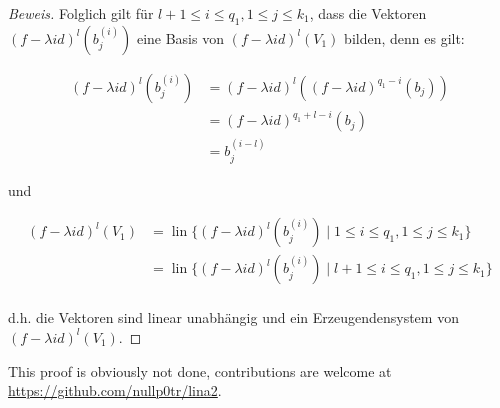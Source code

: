 \documentclass{article}
\newcommand{\basis}[2]{b_{#1}^{({#2})}}
\newcommand{\flam}[1]{(f-{\lambda}id)^{{#1}}}
\DeclareMathOperator{\lin}{lin}
\begin{document}
\begin{proof}[Beweis]
  Folglich gilt für $l+1 \le i \le q_1, 1 \le j \le k_1$, dass die Vektoren $\flam{l}(\basis{j}{i})$ eine Basis
  von $\flam{l}(V_1)$ bilden, denn es gilt:

  \begin{align*}
    \flam{l}(\basis{j}{i}) &= \flam{l}(\flam{q_1-i}(b_j)) \\
                           &= \flam{q_1+l-i}(b_j) \\
                           &= \basis{j}{i-l}
  \end{align*}

  und

  \begin{align*}
    \flam{l}(V_1) &= \lin \{\flam{l}(\basis{j}{i}) \mid 1 \le i \le q_1, 1 \le j \le k_1\} \\
                  &= \lin \{\flam{l}(\basis{j}{i}) \mid l+1 \le i \le q_1, 1 \le j \le k_1\} \\
  \end{align*}

  d.h. die Vektoren sind linear unabhängig und ein Erzeugendensystem von $\flam{l}(V_1)$.

\end{proof}

This proof is obviously not done, contributions are welcome at
\url{https://github.com/nullp0tr/lina2}.
\end{document}
